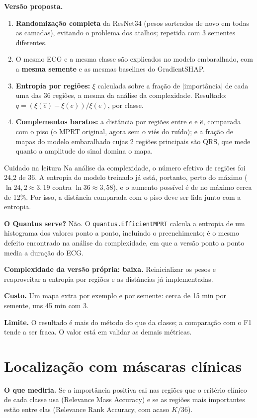 \documentclass[11pt,a4paper]{article}
\begin{document}
\textbf{Versão proposta.}
\begin{enumerate}
\item \textbf{Randomização completa} da ResNet34 (pesos sorteados de novo em todas as camadas), evitando o problema dos atalhos; repetida com 3 sementes diferentes.
\item O mesmo ECG e a mesma classe são explicados no modelo embaralhado, com a \textbf{mesma semente} e as mesmas baselines do GradientSHAP.
\item \textbf{Entropia por regiões:} $\xi$ calculada sobre a fração de $|$importância$|$ de cada uma das 36 regiões, a mesma da análise da complexidade. Resultado: $q = (\xi(\hat{e}) - \xi(e))/\xi(e)$, por classe.
\item \textbf{Complementos baratos:} a distância por regiões entre $e$ e $\hat{e}$, comparada com o piso (o MPRT original, agora sem o viés do ruído); e a fração de mapas do modelo embaralhado cujas 2 regiões principais são QRS, que mede quanto a amplitude do sinal domina o mapa.
\end{enumerate}

\begin{infobox}[warn]{Cuidado na leitura}
Na análise da complexidade, o número efetivo de regiões foi 24,2 de 36. A entropia do modelo treinado já está, portanto, perto do máximo ($\ln 24{,}2 \approx 3{,}19$ contra $\ln 36 \approx 3{,}58$), e o aumento possível é de no máximo cerca de 12\%. Por isso, a distância comparada com o piso deve ser lida junto com a entropia.
\end{infobox}

\textbf{O Quantus serve?} Não. O \texttt{quantus.EfficientMPRT} calcula a entropia de um histograma dos valores ponto a ponto, incluindo o preenchimento; é o mesmo defeito encontrado na análise da complexidade, em que a versão ponto a ponto media a duração do ECG.

\textbf{Complexidade da versão própria: baixa.} Reinicializar os pesos e reaproveitar a entropia por regiões e as distâncias já implementadas.

\textbf{Custo.} Um mapa extra por exemplo e por semente: cerca de 15 min por semente, uns 45 min com 3.

\textbf{Limite.} O resultado é mais do método do que da classe; a comparação com o F1 tende a ser fraca. O valor está em validar as demais métricas.

\section{Localização com máscaras clínicas}
\textbf{O que mediria.} Se a importância positiva cai nas regiões que o critério clínico de cada classe usa (Relevance Mass Accuracy) e se as regiões mais importantes estão entre elas (Relevance Rank Accuracy, com acaso $K/36$).
\end{document}
